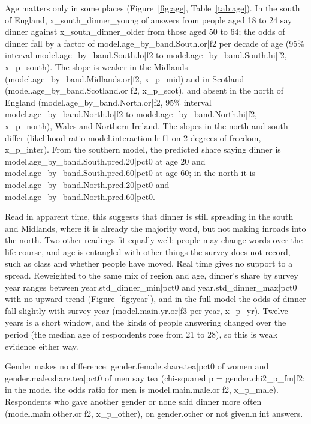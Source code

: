 \documentclass[11pt,a4paper]{article}
\begin{document}
Age matters only in some places (Figure~\ref{fig:age}, Table~\ref{tab:age}). In the south of England, {{x_south_dinner_young}} of answers from people aged 18 to 24 say dinner against {{x_south_dinner_older}} from those aged 50 to 64; the odds of dinner fall by a factor of {{model.age_by_band.South.or|f2}} per decade of age (95\% interval {{model.age_by_band.South.lo|f2}} to {{model.age_by_band.South.hi|f2}}, {{x_p_south}}). The slope is weaker in the Midlands ({{model.age_by_band.Midlands.or|f2}}, {{x_p_mid}}) and in Scotland ({{model.age_by_band.Scotland.or|f2}}, {{x_p_scot}}), and absent in the north of England ({{model.age_by_band.North.or|f2}}, 95\% interval {{model.age_by_band.North.lo|f2}} to {{model.age_by_band.North.hi|f2}}, {{x_p_north}}), Wales and Northern Ireland. The slopes in the north and south differ (likelihood ratio {{model.interaction.lr|f1}} on 2 degrees of freedom, {{x_p_inter}}). From the southern model, the predicted share saying dinner is {{model.age_by_band.South.pred.20|pct0}} at age 20 and {{model.age_by_band.South.pred.60|pct0}} at age 60; in the north it is {{model.age_by_band.North.pred.20|pct0}} and {{model.age_by_band.North.pred.60|pct0}}.

Read in apparent time, this suggests that dinner is still spreading in the south and Midlands, where it is already the majority word, but not making inroads into the north. Two other readings fit equally well: people may change words over the life course, and age is entangled with other things the survey does not record, such as class and whether people have moved. Real time gives no support to a spread. Reweighted to the same mix of region and age, dinner's share by survey year ranges between {{year.std_dinner_min|pct0}} and {{year.std_dinner_max|pct0}} with no upward trend (Figure~\ref{fig:year}), and in the full model the odds of dinner fall slightly with survey year ({{model.main.yr.or|f3}} per year, {{x_p_yr}}). Twelve years is a short window, and the kinds of people answering changed over the period (the median age of respondents rose from 21 to 28), so this is weak evidence either way.

Gender makes no difference: {{gender.female.share.tea|pct0}} of women and {{gender.male.share.tea|pct0}} of men say tea (chi-squared p = {{gender.chi2_p_fm|f2}}; in the model the odds ratio for men is {{model.main.male.or|f2}}, {{x_p_male}}). Respondents who gave another gender or none said dinner more often ({{model.main.other.or|f2}}, {{x_p_other}}), on {{gender.other or not given.n|int}} answers.
\end{document}
